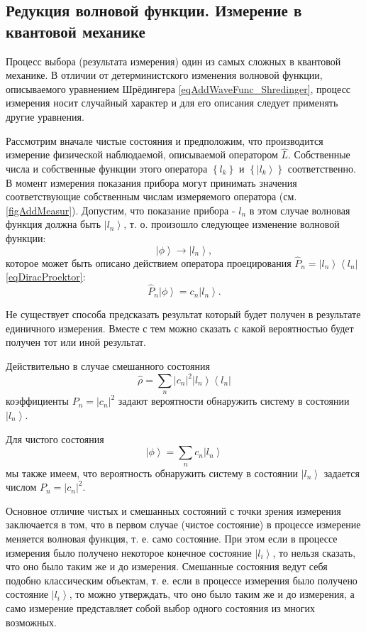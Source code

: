\subsection{Редукция волновой функции. Измерение в квантовой механике}
\label{sec:add:reduction}

Процесс выбора (результата измерения) один из самых сложных в
квантовой механике. В отличии от детерминистского изменения волновой
функции, описываемого уравнением Шрёдингера
\eqref{eqAddWaveFunc_Shredinger}, процесс измерения носит случайный
характер и для его описания следует применять другие уравнения. 



Рассмотрим вначале чистые состояния и предположим, что производится
измерение физической наблюдаемой, 
описываемой оператором $\hat{L}$. Собственные числа и собственные
функции этого оператора $\left\{ l_k \right\}$ и 
$\left\{ \left|l_k\right> \right\}$ соответственно. В момент
измерения показания прибора могут принимать значения соответствующие
собственным числам измеряемого оператора
(см. \autoref{figAddMeasur}). Допустим, что показание 
прибора - $l_n$ в этом случае волновая функция должна быть 
$\left|l_n\right>$, т. о. произошло следующее
изменение волновой функции:
\[
\left| \phi \right> \rightarrow \left|l_n\right>,
\] 
которое может быть описано действием оператора проецирования 
$\hat{P}_n = \left|l_n\right> \left<l_n\right|$ \eqref{eqDiracProektor}:
\[
\hat{P}_n \left| \phi \right> = c_n\left|l_n\right>.
\]

Не существует способа предсказать результат который будет получен в
результате единичного измерения. Вместе с тем можно сказать с какой
вероятностью будет получен тот или иной результат.

Действительно в случае смешанного состояния
\begin{equation}
\hat{\rho} = 
\sum_n \left|c_n\right|^2 \left|l_n\right>\left<l_n\right|
\nonumber
\end{equation}
коэффициенты $P_n = \left|c_n\right|^2$
задают вероятности обнаружить систему в состоянии $\left|l_n\right>$. 

Для чистого состояния
\begin{equation}
\left| \phi \right> = 
\sum_n c_n \left|l_n\right>
\nonumber
\end{equation}
мы также имеем, что вероятность обнаружить систему в состоянии
$\left|l_n\right>$ задается числом $P_n = \left|c_n\right|^2$. 

Основное отличие чистых и смешанных состояний с точки зрения измерения
заключается в том, что в первом случае (чистое состояние) в процессе
измерение меняется волновая функция, т. е. само состояние. При этом
если в процессе измерения было получено некоторое конечное состояние
$\left|l_i\right>$, то нельзя сказать, что оно было таким же и до
измерения. Смешанные состояния ведут себя подобно классическим объектам,
т. е. если в процессе измерения было получено состояние
$\left|l_i\right>$, то можно утверждать, что оно было таким же и до
измерения, а само измерение представляет собой выбор
одного состояния из многих возможных.

